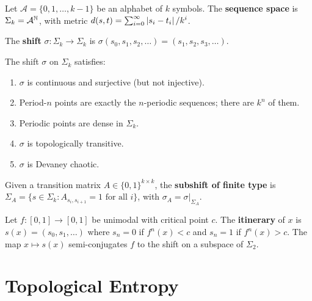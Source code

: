 \begin{definition}
Let $\mathcal{A} = \{0, 1, \ldots, k-1\}$ be an alphabet of $k$ symbols.
The \textbf{sequence space} is
$\Sigma_k = \mathcal{A}^{\mathbb{N}}$, with metric
$d(s, t) = \sum_{i=0}^{\infty}\left| s_i - t_i \right|/k^i$.
\end{definition}

\begin{definition}
The \textbf{shift} $\sigma : \Sigma_k \to \Sigma_k$ is
$\sigma(s_0, s_1, s_2, \ldots) = (s_1, s_2, s_3, \ldots)$.
\end{definition}

\begin{theorem}
The shift $\sigma$ on $\Sigma_k$ satisfies:
\begin{enumerate}
    \item $\sigma$ is continuous and surjective (but not injective).
    \item Period-$n$ points are exactly the $n$-periodic sequences; there are
    $k^n$ of them.
    \item Periodic points are dense in $\Sigma_k$.
    \item $\sigma$ is topologically transitive.
    \item $\sigma$ is Devaney chaotic.
\end{enumerate}
\end{theorem}

\begin{definition}
Given a transition matrix $A \in \{0,1\}^{k \times k}$, the
\textbf{subshift of finite type} is
$\Sigma_A = \{s \in \Sigma_k : A_{s_i, s_{i+1}} = 1 \text{ for all } i\}$,
with $\sigma_A = \sigma|_{\Sigma_A}$.
\end{definition}

\begin{proposition}
Let $f : [0,1] \to [0,1]$ be unimodal with critical point $c$. The
\textbf{itinerary} of $x$ is $s(x) = (s_0, s_1, \ldots)$ where $s_n = 0$
if $f^n(x) < c$ and $s_n = 1$ if $f^n(x) > c$. The map $x \mapsto s(x)$
semi-conjugates $f$ to the shift on a subspace of $\Sigma_2$.
\end{proposition}

\section{Topological Entropy}

